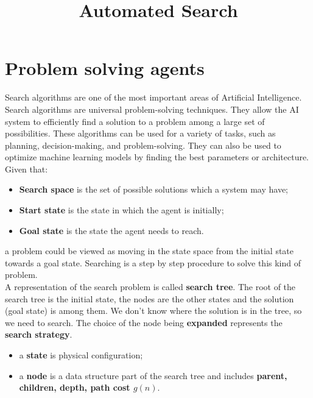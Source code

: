 \documentclass{article}
\title{Automated Search}
\author{}
\date{}
\begin{document}
\maketitle

\section{Problem solving agents}

Search algorithms are one of the most important areas of Artificial Intelligence.\\ 

Search algorithms are universal problem-solving techniques. They allow the AI system to efficiently find a solution to a problem among a large set of possibilities. These algorithms can be used for a variety of tasks, such as planning, decision-making, and problem-solving. They can also be used to optimize machine learning models by finding the best parameters or architecture. \\

Given that:

\begin{center}
    \begin{itemize}
        \item \textbf{Search space} is the set of possible solutions which a system may have;
        \item \textbf{Start state} is the state in which the agent is initially;
        \item \textbf{Goal state} is the state the agent needs to reach.
    \end{itemize}
\end{center}

a problem could be viewed as moving in the state space from the initial state towards a goal state. Searching is a step by step procedure to solve this kind of problem. \\

A representation of the search problem is called \textbf{search tree}. The root of the search tree is the initial state, the nodes are the other states and the solution (goal state) is among them. We don't know where the solution is in the tree, so we need to search. The choice of the node being \textbf{expanded} represents the \textbf{search strategy}. \\

\begin{itemize}
    \item a \textbf{state} is physical configuration;
    \item a \textbf{node} is a data structure part of the search tree and includes \textbf{parent, children, depth, path cost $g(n)$}. 
\end{itemize}
\end{document}
